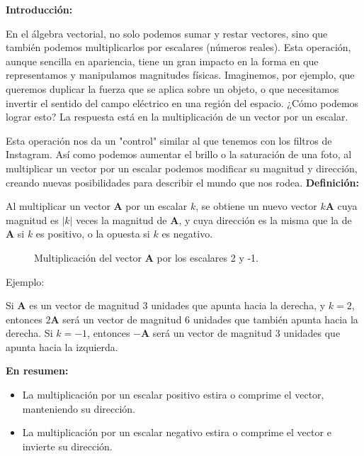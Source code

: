 \documentclass{article}
\begin{document}
\textbf{Introducción:}

En el álgebra vectorial, no solo podemos sumar y restar vectores, sino que también podemos multiplicarlos por escalares (números reales). Esta operación, aunque sencilla en apariencia, tiene un gran impacto en la forma en que representamos y manipulamos magnitudes físicas. Imaginemos, por ejemplo, que queremos duplicar la fuerza que se aplica sobre un objeto, o que necesitamos invertir el sentido del campo eléctrico en una región del espacio. ¿Cómo podemos lograr esto? La respuesta está en la multiplicación de un vector por un escalar.

Esta operación nos da un "control" similar al que tenemos con los filtros de Instagram. Así como podemos aumentar el brillo o la saturación de una foto, al multiplicar un vector por un escalar podemos modificar su magnitud y dirección, creando nuevas posibilidades para describir el mundo que nos rodea.
\newpage
\textbf{Definición:}

Al multiplicar un vector $\mathbf{A}$ por un escalar $k$, se obtiene un nuevo vector $k\mathbf{A}$ cuya magnitud es $|k|$ veces la magnitud de $\mathbf{A}$, y cuya dirección es la misma que la de $\mathbf{A}$ si $k$ es positivo, o la opuesta si $k$ es negativo.

\begin{figure}[H]
\centering
{}
\caption{Multiplicación del vector $\mathbf{A}$ por los escalares 2 y -1.}
\label{fig:multiplicacion_escalar}
\end{figure}

Ejemplo:

Si $\mathbf{A}$ es un vector de magnitud 3 unidades que apunta hacia la derecha, y $k = 2$, entonces $2\mathbf{A}$ será un vector de magnitud 6 unidades que también apunta hacia la derecha. Si $k = -1$, entonces $-\mathbf{A}$ será un vector de magnitud 3 unidades que apunta hacia la izquierda.

\textbf{En resumen:}

\begin{itemize}
\item[\textbullet] La multiplicación por un escalar positivo estira o comprime el vector, manteniendo su dirección.
\item[\textbullet] La multiplicación por un escalar negativo estira o comprime el vector e invierte su dirección.
\end{itemize}
\end{document}
